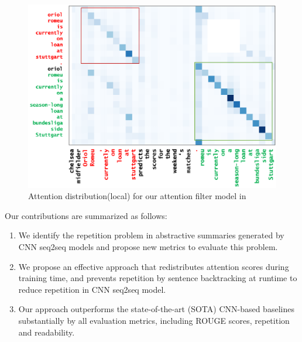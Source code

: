 {\begin{figure}[th!]
\centering
\includegraphics[width=0.9\linewidth]{map3}
\caption{Attention distribution(local) for our attention filter model in }
\label{fig:attn_map3}
\end{figure}
}%

Our contributions are summarized as follows:
\begin{enumerate}
\item We identify the repetition problem in abstractive summaries generated
by CNN seq2seq models and propose new metrics to evaluate this problem.
\item We propose an effective approach that redistributes attention scores 
during training time, and prevents repetition by sentence backtracking
at runtime to reduce repetition in CNN seq2seq model.
\item Our approach
outperforms the state-of-the-art (SOTA) CNN-based baselines 
substantially by all evaluation metrics, including ROUGE scores, 
repetition and readability.
\end{enumerate}


